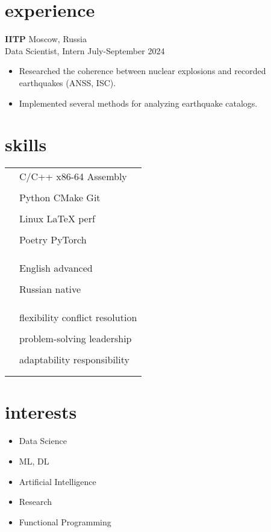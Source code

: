 \documentclass[12pt]{article}
\newcommand{\entry}[4]{{{\textbf{#1}}} \hfill #3 \\ #2 \hfill #4}
\newcommand{\tableentry}[3]{\textsc{#1} & #2\expandafter\ifstrequal\expandafter{#3}{}{\\}{\\[6pt]}}
\begin{document}
\begin{paracol}{2}
		
		\section{experience}
		
		\entry{IITP}{Data Scientist, Intern}{Moscow, Russia}{July-September 2024}
		\begin{itemize}[noitemsep,leftmargin=3.5mm,rightmargin=0mm,topsep=6pt]
			\item Researched the coherence between nuclear explosions and recorded earthquakes (ANSS, ISC).
			\item Implemented several methods for analyzing earthquake catalogs.
		\end{itemize}
		
		\switchcolumn
		
		\section{skills}
		\begin{supertabular}{rl}
			\tableentry{\footnotesize\faCode}{C/C++ \textperiodcentered{} x86-64 Assembly}{}
			\tableentry{}{Python \textperiodcentered{} CMake \textperiodcentered{} Git}{}
			\tableentry{}{Linux
				\textperiodcentered{} LaTeX \textperiodcentered{} perf}{}
			\tableentry{}{Poetry \textperiodcentered{} PyTorch}{}
			
			
			\tableentry{}{}{}
			
			\tableentry{\footnotesize\faLanguage}{English \textperiodcentered{} advanced}{}
			\tableentry{}{Russian \textperiodcentered{} native}{}
			\tableentry{}{}{}
			
			\tableentry{\footnotesize\faComments}{flexibility \textperiodcentered{} conflict resolution}{}
			\tableentry{}{problem-solving \textperiodcentered{} leadership}{}
			\tableentry{}{adaptability \textperiodcentered{} responsibility}{}
		\end{supertabular}
		
		\section{interests}
		\begin{itemize}[noitemsep,leftmargin=3.5mm,rightmargin=0mm,topsep=6pt]
			\item Data Science
			\item ML, DL
			\item Artificial Intelligence
			\item Research
			\item Functional Programming
		\end{itemize}
		

\end{paracol}
\end{document}
